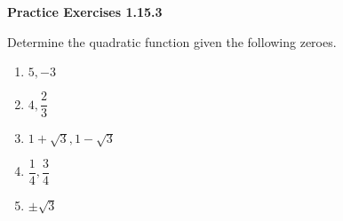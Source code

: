 \noindent\textbf{Practice Exercises 1.15.3}


Determine the quadratic function given the following zeroes. 
\begin{multicols}{3}
\begin{enumerate}[label = \color{blue}\arabic*. ]
\item $5, -3$ 
\item $ 4, \dfrac{2}{3} $
\item $ 1 + \sqrt{3}, 1 - \sqrt{3} $
\item $ \dfrac{1}{4}, \dfrac{3}{4} $
\item $ \pm\sqrt{3} $
\end{enumerate}
\end{multicols} 
